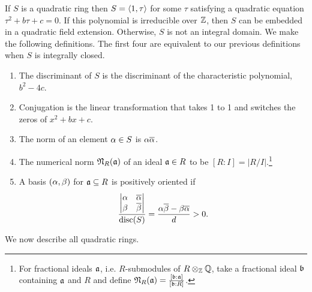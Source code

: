 
If $S$ is a quadratic ring then $S=\left\langle {1,\tau}\right\rangle$ for some $\tau$ satisfying a quadratic equation $\tau^2+b\tau+c=0$. If this polynomial is irreducible over $\mathbb{Z}$, then $S$ can be embedded in a quadratic field extension. Otherwise, $S$ is not an integral domain. 
We make the following definitions. The first four are equivalent to our previous definitions when $S$ is integrally closed.
\begin{enumerate}
\item The discriminant of $S$ is the discriminant of the characteristic polynomial, $b^2-4c$.
\item Conjugation is the linear transformation that takes 1 to 1 and switches the zeros of $x^2+bx+c$.
\item The norm of an element $\alpha\in S$ is $\alpha\overline{\alpha}$.
\item The numerical norm $\mathfrak N_R(\mathfrak{a})$ of an ideal $\mathfrak{a}\in R$ to be $[R:I]=|R/I|$.\footnote{For fractional ideals $\mathfrak{a}$, i.e. $R$-submodules of $R\otimes_{\mathbb{Z}}\mathbb{Q}$, take a fractional ideal $\mathfrak{b}$ containing $\mathfrak{a}$ and $R$ and define $\mathfrak N_R(\mathfrak{a})=\frac{[\mathfrak{b}:\mathfrak{a}]}{[\mathfrak{b}:R]}$.}
\item A basis $(\alpha,\beta)$ for $\mathfrak{a}\subseteq R$ is positively oriented if
\[
\frac{\left| { \begin{matrix} {\alpha}&{\overline{\alpha}}\\ {\beta}&{\overline{\beta}} \end{matrix} } \right|}{\operatorname{disc}(S)}=\frac{\alpha \overline{\beta}-\beta\overline{\alpha}}{d}>0.
\]
\end{enumerate}
We now describe all quadratic rings.
